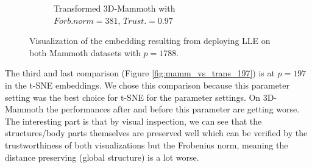 \begin{figure}[!]
\begin{subfigure}[t]{0.49\columnwidth}
    	\caption{Transformed 3D-Mammoth with \\ $Forb.norm=381$, $Trust.=0.97$}
        \label{fig:LOW_trans_Mammoth_lle_1788}
    \end{subfigure}
     \caption[3D-Mammoth vs. Transformed 3D-Mammoth Visualization]{Visualization of the embedding resulting from deploying LLE on both Mammoth datasets with $p=1788$.}
    \label{fig:mamm_vs_trans_1788}
\end{figure}

The third and last comparison (Figure \ref{fig:mamm_vs_trans_197}) is at $p=197$ in the t-SNE embeddings. We chose this comparison because this parameter setting was the best choice for t-SNE for the parameter settings. On 3D-Mammoth the performances after and before this parameter are getting worse. The interesting part is that by visual inspection, we can see that the structures/body parts themselves are preserved well which can be verified by the trustworthiness of both visualizations but the Frobenius norm, meaning the distance preserving (global structure) is a lot worse.

